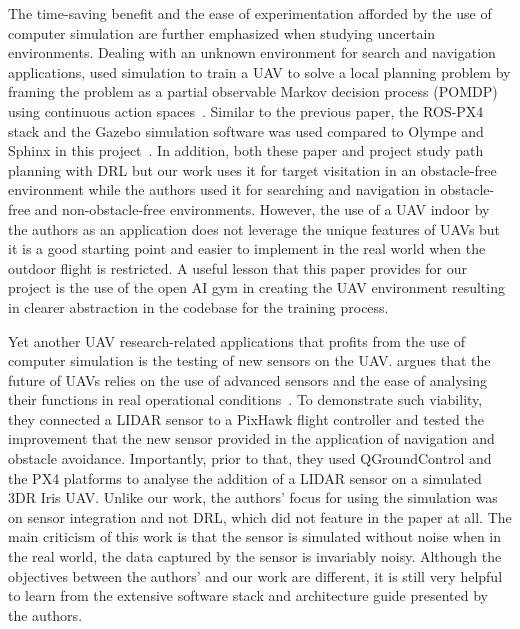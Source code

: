 \documentclass[../main.tex]{subfiles}
\begin{document}
The time-saving benefit and the ease of experimentation 
afforded by the use of computer simulation are further emphasized 
when studying uncertain environments.
Dealing with an unknown environment for search and navigation applications,
\citeauthor{Wal19} used simulation to train a UAV 
to solve a local planning problem
by framing the problem as a 
partial observable Markov decision process (POMDP)
using continuous action spaces~\cite{Wal19}.
Similar to the previous paper, the ROS-PX4 stack and the Gazebo 
simulation software was used compared to Olympe and Sphinx 
in this project~\cite{Wal19}.
In addition, both these paper and project study path planning 
with DRL but our work uses it for target visitation 
in an obstacle-free environment 
while the authors used it for searching and navigation
in obstacle-free and non-obstacle-free environments.
However, the use of a UAV indoor by the authors as an application 
does not leverage the unique features of UAVs 
but it is a good starting point 
and easier to implement in the real world 
when the outdoor flight is restricted.
A useful lesson that this paper provides for our project
is the use of the open AI gym in creating the UAV environment
resulting in clearer abstraction in the codebase
for the training process.

Yet another UAV research-related applications 
that profits from the use of computer simulation 
is the testing of new sensors on the UAV.
\citeauthor{Gar20} argues that the future of UAVs
relies on the use of advanced sensors and 
the ease of analysing their functions
in real operational conditions~\cite{Gar20}.
To demonstrate such viability, they connected a LIDAR sensor
to a PixHawk flight controller and tested the improvement
that the new sensor provided
in the application of navigation and obstacle avoidance.
Importantly, prior to that, they used QGroundControl and the PX4
platforms to analyse the addition of a LIDAR sensor
on a simulated 3DR Iris UAV.
Unlike our work, the authors' focus for using the simulation
was on sensor integration and not DRL, 
which did not feature in the paper at all. 
The main criticism of this work is that 
the sensor is simulated without noise
when in the real world, the data captured
by the sensor is invariably noisy.
Although the objectives between the authors' and our work
are different, it is still very helpful to learn from
the extensive software stack and architecture guide 
presented by the authors.



\blindtext
\end{document}
